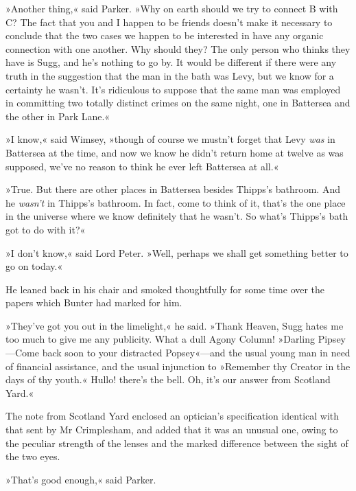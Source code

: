 »Another thing,« said Parker. »Why on earth should we try to connect \textsc{B} with \textsc{C}? The fact that you and I happen to be friends doesn't make it necessary to conclude that the two cases we happen to be interested in have any organic connection with one another. Why should they? The only person who thinks they have is Sugg, and he's nothing to go by. It would be different if there were any truth in the suggestion that the man in the bath was Levy, but we know for a certainty he wasn't. It's ridiculous to suppose that the same man was employed in committing two totally distinct crimes on the same night, one in Battersea and the other in Park Lane.«

»I know,« said Wimsey, »though of course we mustn't forget that Levy \textit{was} in Battersea at the time, and now we know he didn't return home at twelve as was supposed, we've no reason to think he ever left Battersea at all.«

»True. But there are other places in Battersea besides Thipps's bathroom. And he \textit{wasn't} in Thipps's bathroom. In fact, come to think of it, that's the one place in the universe where we know definitely that he wasn't. So what's Thipps's bath got to do with it?«

»I don't know,« said Lord Peter. »Well, perhaps we shall get something better to go on today.«

He leaned back in his chair and smoked thoughtfully for some time over the papers which Bunter had marked for him.

»They've got you out in the limelight,« he said. »Thank Heaven, Sugg hates me too much to give me any publicity. What a dull Agony Column! »Darling Pipsey\allowbreak---\allowbreak Come back soon to your distracted Popsey«---and the usual young man in need of financial assistance, and the usual injunction to »Remember thy Creator in the days of thy youth.« Hullo! there's the bell. Oh, it's our answer from Scotland Yard.«

The note from Scotland Yard enclosed an optician's specification identical with that sent by Mr Crimplesham, and added that it was an unusual one, owing to the peculiar strength of the lenses and the marked difference between the sight of the two eyes.

»That's good enough,« said Parker.

